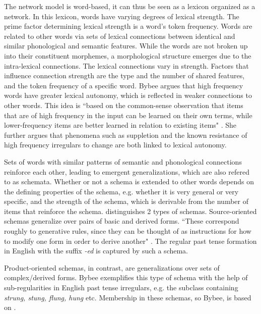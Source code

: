 The network model is word-based, it can thus be seen as a lexicon
organized as a network. In this lexicon, words  have varying degrees of
lexical strength. The prime factor determining lexical strength is a word's token frequency. 
Words are related to other words via sets of
lexical connections between identical and similar phonological and
semantic features. While the words are not broken up into their
constituent morphemes, a morphological structure emerges due to the
intra-lexical connections. The lexical connections vary in
strength. Factors that influence connection strength are the type and
the number of shared features, and the token frequency of a specific
word. 
Bybee argues that high frequency words  have greater lexical autonomy,
which is reflected in weaker
connections to other words. This idea is ``based on the common-sense
observation that items that are of high frequency in the input can be
learned on their own terms, while lower-frequency items are better
learned in relation to existing items" \citep[429]{Bybee:1995}. She further argues that phenomena such as suppletion and the known
resistance of high frequency irregulars to change are both linked to
lexical autonomy.

Sets of words with similar patterns of semantic and phonological
connections reinforce each other, leading to emergent generalizations,
which are also refered to as schemata. Whether or not a schema is extended to other words
depends on the defining properties of the schema, e.g. whether it is
very general or very specific, and the strength of the schema,
which is derivable from the number of items that reinforce the
schema. \citet{Bybee:1995} distinguishes 2 types of schemas.
Source-oriented schemas generalize over pairs of basic and derived
forms. ``These correspond roughly to generative rules, since they can be
thought of as instructions for how to modify one form in order to
derive another" \citep[430]{Bybee:1995}. The regular past
tense formation in English with the suffix \emph{-ed} is captured by such a schema.

Product-oriented schemas, in contrast, are
generalizations over sets of complex/derived forms. Bybee exemplifies
this type of schema with the help of sub-regularities in English past
tense irregulars, e.g. the subclass containing \emph{strung, stung, flung, hung} etc. 
Membership in
these schemas, so Bybee,
is based on .

